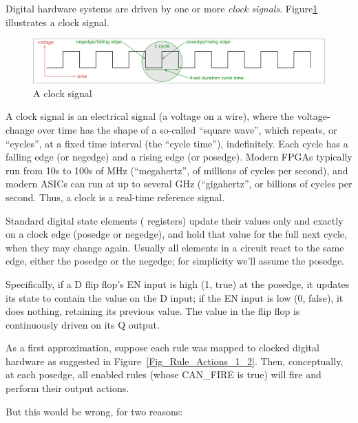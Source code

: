 Digital hardware systems are driven by one or more \emph{clock
signals}. Figure\ref{Fig_Clock} illustrates a clock signal.
\begin{figure}[htbp]
  \centerline{\includegraphics[width=6in,angle=0]{Figures/Fig_Clock}}
  \caption{\label{Fig_Clock} A clock signal}
\end{figure}
A clock signal is an electrical signal (a voltage on a wire), where
the voltage-change over time has the shape of a so-called ``square
wave'', which repeats, or ``cycles'', at a fixed time interval (the
``cycle time''), indefinitely.  Each cycle has a falling edge (or
negedge) and a rising edge (or posedge).  Modern FPGAs typically run
from 10s to 100s of MHz (``megahertz'', of millions of cycles per
second), and modern ASICs can run at up to several GHz (``gigahertz'',
or billions of cycles per second.  Thus, a clock is a real-time
reference signal.

Standard digital state elements ({\eg} registers) update their values
only and exactly on a clock edge (posedge or negedge), and hold that
value for the full next cycle, when they may change again.  Usually
all elements in a circuit react to the same edge, either the posedge
or the negedge; for simplicity we'll assume the posedge.

Specifically, if a D flip flop's EN input is high (1, true) at the
posedge, it updates its state to contain the value on the D input; if
the EN input is low (0, false), it does nothing, retaining its
previous value.  The value in the flip flop is continuously driven on
its Q output.

As a first approximation, suppose each rule was mapped to clocked
digital hardware as suggested in Figure~\ref{Fig_Rule_Actions_1_2}.
Then, conceptually, at each posedge, all enabled rules (whose
CAN\_FIRE is true) will fire and perform their output actions.

But this would be wrong, for two reasons:

